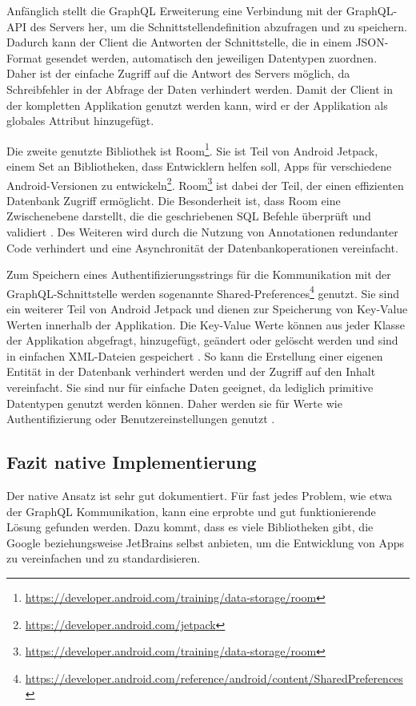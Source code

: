 Anfänglich stellt die GraphQL Erweiterung eine Verbindung mit der GraphQL-API des Servers her, um die Schnittstellendefinition abzufragen und zu speichern. Dadurch kann der Client die Antworten der Schnittstelle, die in einem JSON-Format gesendet werden, automatisch den jeweiligen Datentypen zuordnen. Daher ist der einfache Zugriff auf die Antwort des Servers möglich, da Schreibfehler in der Abfrage der Daten verhindert werden.
Damit der Client in der kompletten Applikation genutzt werden kann, wird er der Applikation als globales Attribut hinzugefügt.


Die zweite genutzte Bibliothek ist Room\footnote{\url{https://developer.android.com/training/data-storage/room}}. Sie ist Teil von Android Jetpack, einem Set an Bibliotheken, dass Entwicklern helfen soll, Apps für verschiedene Android-Versionen zu entwickeln\footnote{\url{https://developer.android.com/jetpack}}. Room\footnote{\url{https://developer.android.com/training/data-storage/room}} ist dabei der Teil, der einen effizienten Datenbank Zugriff ermöglicht.
Die Besonderheit ist, dass Room eine Zwischenebene darstellt, die die geschriebenen SQL Befehle überprüft und validiert \cite{Android_Room}. Des Weiteren wird durch die Nutzung von Annotationen redundanter Code verhindert und eine Asynchronität der Datenbankoperationen vereinfacht.

Zum Speichern eines Authentifizierungsstrings für die Kommunikation mit der GraphQL-\break Schnittstelle werden sogenannte Shared-Preferences\footnote{\url{https://developer.android.com/reference/android/content/SharedPreferences}} genutzt. 
Sie sind ein weiterer Teil von Android Jetpack und dienen zur Speicherung von Key-Value Werten innerhalb der Applikation. 
Die Key-Value Werte können aus jeder Klasse der Applikation abgefragt, hinzugefügt, geändert oder gelöscht werden und sind in einfachen XML-Dateien gespeichert \cite{Shared_Preferences_Android}. 
So kann die Erstellung einer eigenen Entität in der Datenbank verhindert werden und der Zugriff auf den Inhalt vereinfacht. 
Sie sind nur für einfache Daten geeignet, da lediglich primitive Datentypen genutzt werden können. 
Daher werden sie für Werte wie Authentifizierung oder Benutzereinstellungen genutzt \cite{Shared_Preferences_Android}.


\subsection{Fazit native Implementierung}
Der native Ansatz ist sehr gut dokumentiert. Für fast jedes Problem, wie etwa der GraphQL Kommunikation, kann eine erprobte und gut funktionierende Lösung gefunden werden. Dazu kommt, dass es viele Bibliotheken gibt, die Google beziehungsweise JetBrains selbst anbieten, um die Entwicklung von Apps zu vereinfachen und zu standardisieren.

